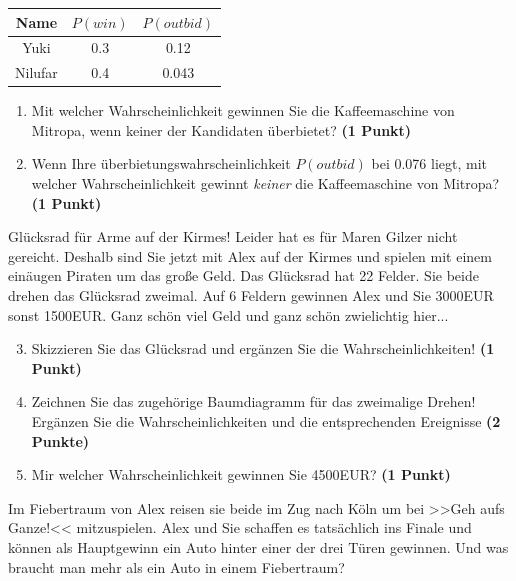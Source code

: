 \documentclass[a4paper, 9pt]{scrartcl}\usepackage[]{graphicx}\usepackage[]{xcolor}
\begin{document}
\begin{center}
\begin{tabular}{ccc}
  \toprule
  Name & $P(win)$ & $P(outbid)$\\
  \midrule
  Yuki & 0.3 & 0.12\\
  Nilufar & 0.4 & 0.043 \\
  \bottomrule
\end{tabular}
\end{center}

\begin{enumerate}
\item Mit welcher Wahrscheinlichkeit gewinnen Sie die Kaffeemaschine von Mitropa, wenn keiner der Kandidaten überbietet? \textbf{(1 Punkt)}
\item Wenn Ihre überbietungswahrscheinlichkeit $P(outbid)$ bei 0.076 liegt, mit welcher Wahrscheinlichkeit gewinnt \textit{keiner} die Kaffeemaschine von Mitropa? \textbf{(1 Punkt)}
\end{enumerate}

Glücksrad für Arme auf der Kirmes! Leider hat es für Maren Gilzer nicht gereicht. Deshalb sind Sie jetzt mit Alex auf der Kirmes und spielen mit einem einäugen Piraten um das große Geld. Das Glücksrad hat 22 Felder. Sie beide drehen das Glücksrad zweimal. Auf 6 Feldern gewinnen Alex und Sie 3000EUR sonst 1500EUR. Ganz schön viel Geld und ganz schön zwielichtig hier...

\begin{enumerate}
  \setcounter{enumi}{2}  
\item Skizzieren Sie das Glücksrad und ergänzen Sie die Wahrscheinlichkeiten! \textbf{(1 Punkt)}
\item Zeichnen Sie das zugehörige Baumdiagramm für das zweimalige Drehen! Ergänzen Sie die Wahrscheinlichkeiten und die entsprechenden Ereignisse \textbf{(2 Punkte)}
\item Mir welcher Wahrscheinlichkeit gewinnen Sie 4500EUR? \textbf{(1 Punkt)}
\end{enumerate}

Im Fiebertraum von Alex reisen sie beide im Zug nach Köln um bei >>Geh aufs Ganze!<< mitzuspielen. Alex und Sie schaffen es tatsächlich ins Finale und können als Hauptgewinn ein Auto hinter einer der drei Türen gewinnen. Und was braucht man mehr als ein Auto in einem Fiebertraum? 
\end{document}
